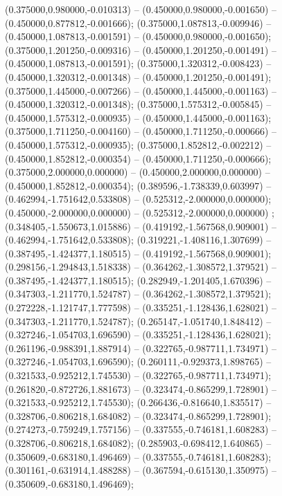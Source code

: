  (0.375000,0.980000,-0.010313) -- (0.450000,0.980000,-0.001650) -- (0.450000,0.877812,-0.001666);
 (0.375000,1.087813,-0.009946) -- (0.450000,1.087813,-0.001591) -- (0.450000,0.980000,-0.001650);
 (0.375000,1.201250,-0.009316) -- (0.450000,1.201250,-0.001491) -- (0.450000,1.087813,-0.001591);
 (0.375000,1.320312,-0.008423) -- (0.450000,1.320312,-0.001348) -- (0.450000,1.201250,-0.001491);
 (0.375000,1.445000,-0.007266) -- (0.450000,1.445000,-0.001163) -- (0.450000,1.320312,-0.001348);
 (0.375000,1.575312,-0.005845) -- (0.450000,1.575312,-0.000935) -- (0.450000,1.445000,-0.001163);
 (0.375000,1.711250,-0.004160) -- (0.450000,1.711250,-0.000666) -- (0.450000,1.575312,-0.000935);
 (0.375000,1.852812,-0.002212) -- (0.450000,1.852812,-0.000354) -- (0.450000,1.711250,-0.000666);
 (0.375000,2.000000,0.000000) -- (0.450000,2.000000,0.000000) -- (0.450000,1.852812,-0.000354);
 (0.389596,-1.738339,0.603997) -- (0.462994,-1.751642,0.533808) -- (0.525312,-2.000000,0.000000);
 (0.450000,-2.000000,0.000000) -- (0.525312,-2.000000,0.000000) ;
 (0.348405,-1.550673,1.015886) -- (0.419192,-1.567568,0.909001) -- (0.462994,-1.751642,0.533808);
 (0.319221,-1.408116,1.307699) -- (0.387495,-1.424377,1.180515) -- (0.419192,-1.567568,0.909001);
 (0.298156,-1.294843,1.518338) -- (0.364262,-1.308572,1.379521) -- (0.387495,-1.424377,1.180515);
 (0.282949,-1.201405,1.670396) -- (0.347303,-1.211770,1.524787) -- (0.364262,-1.308572,1.379521);
 (0.272228,-1.121747,1.777598) -- (0.335251,-1.128436,1.628021) -- (0.347303,-1.211770,1.524787);
 (0.265147,-1.051740,1.848412) -- (0.327246,-1.054703,1.696590) -- (0.335251,-1.128436,1.628021);
 (0.261196,-0.988391,1.887914) -- (0.322765,-0.987711,1.734971) -- (0.327246,-1.054703,1.696590);
 (0.260111,-0.929373,1.898765) -- (0.321533,-0.925212,1.745530) -- (0.322765,-0.987711,1.734971);
 (0.261820,-0.872726,1.881673) -- (0.323474,-0.865299,1.728901) -- (0.321533,-0.925212,1.745530);
 (0.266436,-0.816640,1.835517) -- (0.328706,-0.806218,1.684082) -- (0.323474,-0.865299,1.728901);
 (0.274273,-0.759249,1.757156) -- (0.337555,-0.746181,1.608283) -- (0.328706,-0.806218,1.684082);
 (0.285903,-0.698412,1.640865) -- (0.350609,-0.683180,1.496469) -- (0.337555,-0.746181,1.608283);
 (0.301161,-0.631914,1.488288) -- (0.367594,-0.615130,1.350975) -- (0.350609,-0.683180,1.496469);
